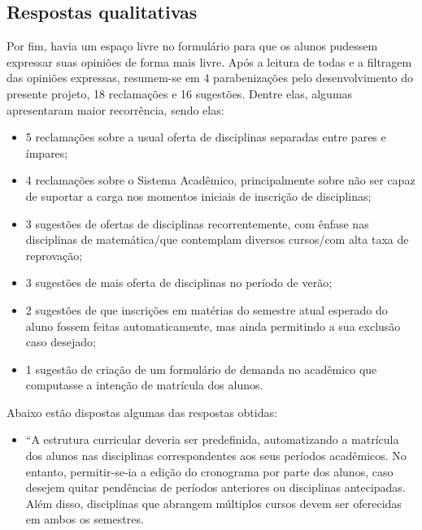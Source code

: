 \begin{apendicesenv}
  \section*{Respostas qualitativas} \label{sec:Respostas qualitativas}

  Por fim, havia um espaço livre no formulário para que os alunos pudessem expressar suas opiniões de forma mais livre. Após a leitura de todas e a filtragem das opiniões expressas, resumem-se em 4 parabenizações pelo desenvolvimento do presente projeto, 18 reclamações e 16 sugestões. Dentre elas, algumas apresentaram maior recorrência, sendo elas:

  \begin{itemize}
    \item 5 reclamações sobre a usual oferta de disciplinas separadas entre pares e ímpares;
    \item 4 reclamações sobre o Sistema Acadêmico, principalmente sobre não ser capaz de suportar a carga nos momentos iniciais de inscrição de disciplinas;
    \item 3 sugestões de ofertas de disciplinas recorrentemente, com ênfase nas disciplinas de matemática/que contemplam diversos cursos/com alta taxa de reprovação;
    \item 3 sugestões de mais oferta de disciplinas no período de verão;
    \item 2 sugestões de que inscrições em matérias do semestre atual esperado do aluno fossem feitas automaticamente, mas ainda permitindo a sua exclusão caso desejado;
    \item 1 sugestão de criação de um formulário de demanda no acadêmico que computasse a intenção de matrícula dos alunos.
  \end{itemize}

  Abaixo estão dispostas algumas das respostas obtidas:

  \begin{itemize}
    \item ``A estrutura curricular deveria ser predefinida, automatizando a matrícula dos alunos nas disciplinas correspondentes aos seus períodos acadêmicos. No entanto, permitir-se-ia a edição do cronograma por parte dos alunos, caso desejem quitar pendências de períodos anteriores ou disciplinas antecipadas. Além disso, disciplinas que abrangem múltiplos cursos devem ser oferecidas em ambos os semestres.


\end{itemize}
\end{apendicesenv}
